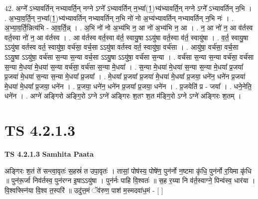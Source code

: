 \documentclass[17pt]{extarticle}
\begin{document}
42. अग्ने᳚ ऽभ्यावर्तिन् नभ्यावर्ति॒न् नग्ने ऽग्ने᳚ ऽभ्यावर्तिन् न॒भ्या᳚(1॒)भ्य॑भ्यावर्ति॒न् नग्ने ऽग्ने᳚ ऽभ्यावर्तिन् न॒भि । . अ॒भ्या॒व॒र्ति॒न् न॒भ्या᳚(1॒)भ्य॑भ्यावर्तिन् नभ्यावर्तिन् न॒भि नो॑ नो अ॒भ्य॑भ्यावर्तिन् नभ्यावर्तिन् न॒भि नः॑ । . अ॒भ्या॒व॒र्ति॒न्नित्य॑भि - आ॒व॒र्ति॒न्न् । . अ॒भि नो॑ नो अ॒भ्य॑भि न॒ आ नो॑ अ॒भ्य॑भि न॒ आ । . न॒ आ नो॑ न॒ आ व॑र्तस्व वर्त॒स्वा नो॑ न॒ आ व॑र्तस्व । . आ व॑र्तस्व वर्त॒स्वा व॑र्त॒ स्वायु॒षा ऽऽयु॑षा वर्त॒स्वा व॑र्त॒ स्वायु॑षा । . व॒र्त॒ स्वायु॒षा ऽऽयु॑षा वर्तस्व वर्त॒ स्वायु॑षा॒ वर्च॑सा॒ वर्च॒सा ऽऽयु॑षा वर्तस्व वर्त॒ स्वायु॑षा॒ वर्च॑सा । . आयु॑षा॒ वर्च॑सा॒ वर्च॒सा ऽऽयु॒षा ऽऽयु॑षा॒ वर्च॑सा स॒न्या स॒न्या वर्च॒सा ऽऽयु॒षा ऽऽयु॑षा॒ वर्च॑सा स॒न्या । . वर्च॑सा स॒न्या स॒न्या वर्च॑सा॒ वर्च॑सा स॒न्या मे॒धया॑ मे॒धया॑ स॒न्या वर्च॑सा॒ वर्च॑सा स॒न्या मे॒धया᳚ । . स॒न्या मे॒धया॑ मे॒धया॑ स॒न्या स॒न्या मे॒धया᳚ प्र॒जया᳚ प्र॒जया॑ मे॒धया॑ स॒न्या स॒न्या मे॒धया᳚ प्र॒जया᳚ । . मे॒धया᳚ प्र॒जया᳚ प्र॒जया॑ मे॒धया॑ मे॒धया᳚ प्र॒जया॒ धने॑न॒ धने॑न प्र॒जया॑ मे॒धया॑ मे॒धया᳚ प्र॒जया॒ धने॑न । . प्र॒जया॒ धने॑न॒ धने॑न प्र॒जया᳚ प्र॒जया॒ धने॑न । . प्र॒जयेति॑ प्र - जया᳚ । . धने॒नेति॒ धने॑न । . अग्ने॑ अङ्गिरो अङ्गि॒रो ऽग्ने ऽग्ने॑ अङ्गिरः श॒तꣳ श॒त म॑ङ्गि॒रो ऽग्ने ऽग्ने॑ अङ्गिरः श॒तम् । \newline
\pagebreak
{}

\section{ TS 4.2.1.3 }

\textbf{TS 4.2.1.3 } \newline
\textbf{Samhita Paata} \newline

अङ्गिरः श॒तं ते॑ सन्त्वा॒वृतः॑ स॒हस्रं॑ त उपा॒वृतः॑ । तासां॒ पोष॑स्य॒ पोषे॑ण॒ पुन॑र्नो न॒ष्टमा कृ॑धि॒ पुन॑र्नो र॒यिमा कृ॑धि ॥ पुन॑रू॒र्जा निव॑र्तस्व॒ पुन॑रग्न इ॒षाऽऽयु॑षा । पुन॑र्नः पाहि वि॒श्वतः॑ ॥ स॒ह र॒य्या नि व॑र्त॒स्वाग्ने॒ पिन्व॑स्व॒ धार॑या । वि॒श्वफ्स्नि॑या वि॒श्व त॒स्परि॑ ॥ उदु॑त्त॒मं ॅव॑रुण॒ पाश॑ म॒स्मदवा॑ध॒मं - [  ] \newline
\end{document}
